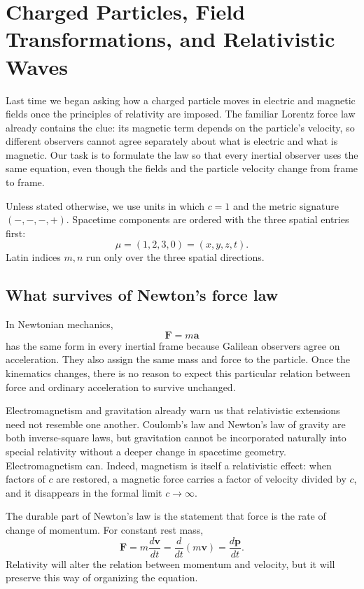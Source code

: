 \chapter{Charged Particles, Field Transformations, and Relativistic Waves}

Last time we began asking how a charged particle moves in electric and
magnetic fields once the principles of relativity are imposed. The familiar
Lorentz force law already contains the clue: its magnetic term depends on the
particle's velocity, so different observers cannot agree separately about
what is electric and what is magnetic. Our task is to formulate the law so
that every inertial observer uses the same equation, even though the fields
and the particle velocity change from frame to frame.

Unless stated otherwise, we use units in which \(c=1\) and the metric
signature \((-,-,-,+)\). Spacetime components are ordered with the three
spatial entries first:
\begin{equation}
  \mu=(1,2,3,0)=(x,y,z,t).
\end{equation}
Latin indices \(m,n\) run only over the three spatial directions.

\section{What survives of Newton's force law}

In Newtonian mechanics,
\begin{equation}
  \boldsymbol F=m\boldsymbol a
\end{equation}
has the same form in every inertial frame because Galilean observers agree
on acceleration. They also assign the same mass and force to the particle.
Once the kinematics changes, there is no reason to expect this particular
relation between force and ordinary acceleration to survive unchanged.

Electromagnetism and gravitation already warn us that relativistic
extensions need not resemble one another. Coulomb's law and Newton's law of
gravity are both inverse-square laws, but gravitation cannot be incorporated
naturally into special relativity without a deeper change in spacetime
geometry. Electromagnetism can. Indeed, magnetism is itself a relativistic
effect: when factors of \(c\) are restored, a magnetic force carries a factor
of velocity divided by \(c\), and it disappears in the formal limit
\(c\to\infty\).

The durable part of Newton's law is the statement that force is the rate of
change of momentum. For constant rest mass,
\begin{equation}
  \boldsymbol F
  =m\frac{d\boldsymbol v}{dt}
  =\frac{d}{dt}(m\boldsymbol v)
  =\frac{d\boldsymbol p}{dt}.
\end{equation}
Relativity will alter the relation between momentum and velocity, but it
will preserve this way of organizing the equation.

